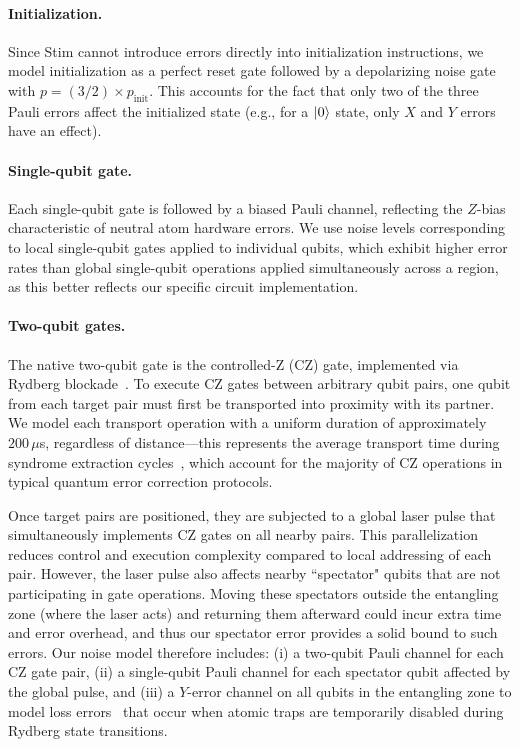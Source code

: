 \documentclass[aps, prx, reprint, superscriptaddress, longbibliography, floatfix]{revtex4-2}
\begin{document}
\paragraph{Initialization.} Since Stim cannot introduce errors directly into initialization instructions, we model initialization as a perfect reset gate followed by a depolarizing noise gate with $p=(3/2) \times p_{\text{init}}$. This accounts for the fact that only two of the three Pauli errors affect the initialized state (e.g., for a $\ket{0}$ state, only $X$ and $Y$ errors have an effect).


\paragraph{Single-qubit gate.} Each single-qubit gate is followed by a biased Pauli channel, reflecting the $Z$-bias characteristic of neutral atom hardware errors. We use noise levels corresponding to local single-qubit gates applied to individual qubits, which exhibit higher error rates than global single-qubit operations applied simultaneously across a region, as this better reflects our specific circuit implementation.

\paragraph{Two-qubit gates.} The native two-qubit gate is the controlled-Z (CZ) gate, implemented via Rydberg blockade~\cite{Evered2023}. To execute CZ gates between arbitrary qubit pairs, one qubit from each target pair must first be transported into proximity with its partner. We model each transport operation with a uniform duration of approximately $200 \, \mu$s, regardless of distance—this represents the average transport time during syndrome extraction cycles~\cite{Rodriguez2024}, which account for the majority of CZ operations in typical quantum error correction protocols.

Once target pairs are positioned, they are subjected to a global laser pulse that simultaneously implements CZ gates on all nearby pairs. This parallelization reduces control and execution complexity compared to local addressing of each pair. However, the laser pulse also affects nearby ``spectator" qubits that are not participating in gate operations. Moving these spectators outside the entangling zone (where the laser acts) and returning them afterward could incur extra time and error overhead, and thus our spectator error provides a solid bound to such errors.
Our noise model therefore includes: (i) a two-qubit Pauli channel for each CZ gate pair, (ii) a single-qubit Pauli channel for each spectator qubit affected by the global pulse, and (iii) a $Y$-error channel on all qubits in the entangling zone to model loss errors~\cite{Evered2023, Bluvstein2025b} that occur when atomic traps are temporarily disabled during Rydberg state transitions. 
\end{document}
